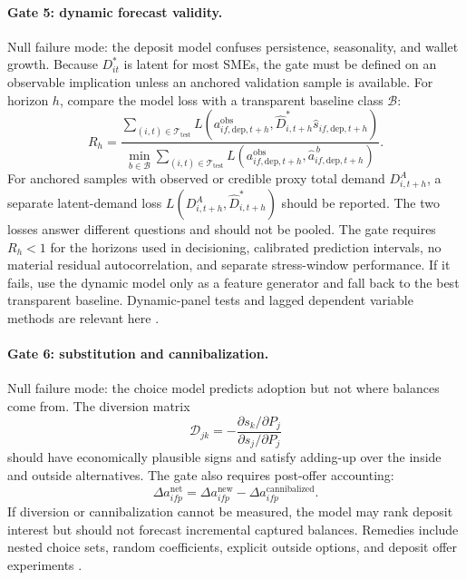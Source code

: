 \documentclass[11pt]{article}
\begin{document}
\paragraph{Gate 5: dynamic forecast validity.}
Null failure mode: the deposit model confuses persistence, seasonality, and
wallet growth. Because $D_{it}^{*}$ is latent for most SMEs, the gate must be
defined on an observable implication unless an anchored validation sample is
available. For horizon $h$, compare the model loss with a transparent baseline
class $\mathcal{B}$:
\[
  R_h
  =
  \frac{\sum_{(i,t)\in\mathcal{T}_{\mathrm{test}}}
    L(a_{if,\mathrm{dep},t+h}^{\mathrm{obs}},
      \widehat{D}_{i,t+h}^{*}\widehat{s}_{if,\mathrm{dep},t+h})}
  {\min_{b\in\mathcal{B}}\sum_{(i,t)\in\mathcal{T}_{\mathrm{test}}}
    L(a_{if,\mathrm{dep},t+h}^{\mathrm{obs}},
      \widehat{a}_{if,\mathrm{dep},t+h}^{\,b})}.
\]
For anchored samples with observed or credible proxy total demand
$D_{i,t+h}^{A}$, a separate latent-demand loss
$L(D_{i,t+h}^{A},\widehat{D}_{i,t+h}^{*})$ should be reported. The two losses
answer different questions and should not be pooled.
The gate requires $R_h<1$ for the horizons used in decisioning, calibrated
prediction intervals, no material residual autocorrelation, and separate
stress-window performance. If it fails, use the dynamic model only as a feature
generator and fall back to the best transparent baseline. Dynamic-panel tests
and lagged dependent variable methods are relevant here
\citep{arellano1991panel}.

\paragraph{Gate 6: substitution and cannibalization.}
Null failure mode: the choice model predicts adoption but not where balances
come from. The diversion matrix
\[
  \mathcal{D}_{jk}
  =
  -\frac{\partial s_k/\partial P_j}{\partial s_j/\partial P_j}
\]
should have economically plausible signs and satisfy adding-up over the
inside and outside alternatives. The gate also requires post-offer accounting:
\[
  \Delta a_{ifp}^{\mathrm{net}}
  =
  \Delta a_{ifp}^{\mathrm{new}}
  -\Delta a_{ifp}^{\mathrm{cannibalized}}.
\]
If diversion or cannibalization cannot be measured, the model may rank deposit
interest but should not forecast incremental captured balances. Remedies include
nested choice sets, random coefficients, explicit outside options, and deposit
offer experiments \citep{berry1995automobile,train2009discrete}.
\end{document}
